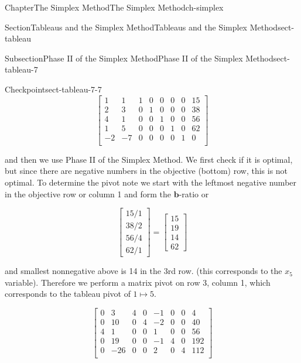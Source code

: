 \documentclass[oneside,10pt,]{book}
\numberwithin{equation}{section}
\newcommand{\amp}{&}
\begin{document}
\begin{chapterptx}{Chapter}{The Simplex Method}{}{The Simplex Method}{}{}{ch-simplex}
\begin{sectionptx}{Section}{Tableaus and the Simplex Method}{}{Tableaus and the Simplex Method}{}{}{sect-tableau}
\begin{subsectionptx}{Subsection}{Phase II of the Simplex Method}{}{Phase II of the Simplex Method}{}{}{sect-tableau-7}
\begin{inlineexercise}{Checkpoint}{}{sect-tableau-7-7}
%
\begin{equation*}
\left[\begin{array}{rr|rrrrr|r} 1 \amp 1 \amp 1 \amp 0 \amp 0 \amp 0 \amp 0 \amp 15\\ 2 \amp 3 \amp 0 \amp 1 \amp 0 \amp 0 \amp 0 \amp 38\\ 4 \amp 1 \amp 0 \amp 0 \amp 1 \amp 0 \amp 0 \amp 56\\ 1 \amp 5 \amp 0 \amp 0 \amp 0 \amp 1 \amp 0 \amp 62\\ \hline -2 \amp -7 \amp 0 \amp 0 \amp 0 \amp 0 \amp 1 \amp 0\\ \end{array} \right]
\end{equation*}
%
\par
and then we use Phase II of the Simplex Method. We first check if it is optimal, but since there are negative numbers in the objective (bottom) row, this is not optimal.\footnotemark{} To determine the pivot note we start with the leftmost negative number in the objective row or column 1 and form the \(\boldsymbol{b}\)-ratio or%
\par
%
\begin{equation*}
\begin{bmatrix} 15/1 \\ 38/2 \\ 56/4 \\ 62/1 \end{bmatrix} = \begin{bmatrix} 15 \\ 19 \\ 14 \\ 62 \end{bmatrix}
\end{equation*}
%
\par
and smallest nonnegative above is 14 in the 3rd row. (this corresponds to the \(x_5\) variable). Therefore we perform a matrix pivot on row 3, column 1, which corresponds to the tableau pivot of \(1 \mapsto 5\).%
\par
%
\begin{equation*}
\left[\begin{array}{rr|rrrrr|r} 0 \amp 3 \amp 4 \amp 0 \amp -1 \amp 0 \amp 0 \amp 4\\ 0 \amp 10 \amp 0 \amp 4 \amp -2 \amp 0 \amp 0 \amp 40\\ 4 \amp 1 \amp 0 \amp 0 \amp 1 \amp 0 \amp 0 \amp 56\\ 0 \amp 19 \amp 0 \amp 0 \amp -1 \amp 4 \amp 0 \amp 192\\ \hline 0 \amp -26 \amp 0 \amp 0 \amp 2 \amp 0 \amp 4 \amp 112\\ \end{array} \right]

\end{equation*}
\end{inlineexercise}
\end{subsectionptx}
\end{sectionptx}
\end{chapterptx}
\end{document}
